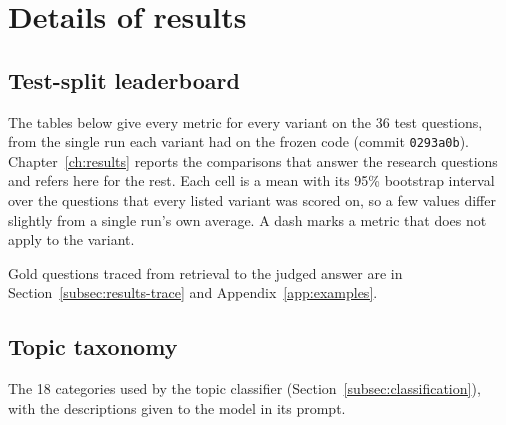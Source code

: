 \chapter{Details of results} \label{app:results}


\section{Test-split leaderboard} \label{sec:app-leaderboard}

The tables below give every metric for every variant on the 36 test questions,
from the single run each variant had on the frozen code (commit
\texttt{0293a0b}). Chapter~\ref{ch:results} reports the comparisons that answer
the research questions and refers here for the rest. Each cell is a mean with
its 95\% bootstrap interval over the questions that every listed variant was
scored on, so a few values differ slightly from a single run's own average. A
dash marks a metric that does not apply to the variant.



Gold questions traced from retrieval to the judged answer are in
Section~\ref{subsec:results-trace} and Appendix~\ref{app:examples}.

\section{Topic taxonomy} \label{sec:taxonomy}

The 18 categories used by the topic classifier
(Section~\ref{subsec:classification}), with the descriptions given to the
model in its prompt.

